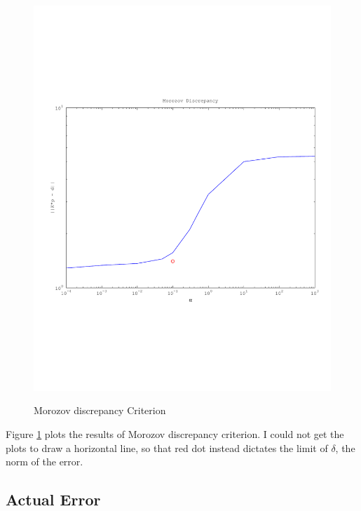 \documentclass{article}
\begin{document}
\begin{figure}[!htb]
  \includegraphics[scale=.5]{plots/morozov.pdf}
  \label{fig:data}
  \caption{Morozov discrepancy Criterion} 
 \label{fig:moro}
\end{figure}

Figure \ref{fig:moro} plots the results of Morozov discrepancy
criterion. I could not get the plots to draw a horizontal line, so that
red dot instead dictates the limit of $\delta$, the norm of the error. 


\subsection{Actual Error}
\end{document}
